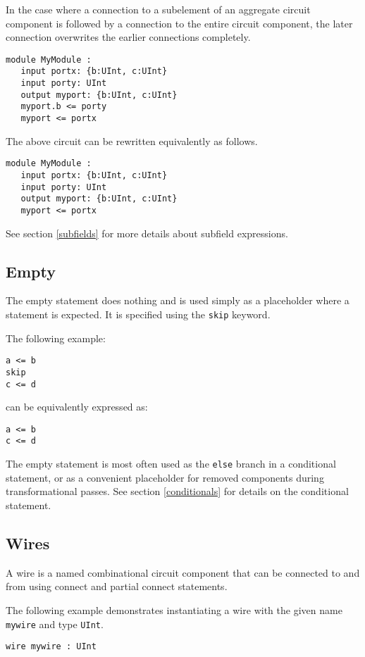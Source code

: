 \documentclass[12pt]{article}
\begin{document}
In the case where a connection to a subelement of an aggregate circuit component is followed by a connection to the entire circuit component, the later connection overwrites the earlier connections completely.

\begin{verbatim}
module MyModule :
   input portx: {b:UInt, c:UInt}
   input porty: UInt
   output myport: {b:UInt, c:UInt}
   myport.b <= porty
   myport <= portx
\end{verbatim}
The above circuit can be rewritten equivalently as follows.
\begin{verbatim}
module MyModule :
   input portx: {b:UInt, c:UInt}
   input porty: UInt
   output myport: {b:UInt, c:UInt}
   myport <= portx
\end{verbatim}

See section \ref{subfields} for more details about subfield expressions.

\subsection{Empty}
The empty statement does nothing and is used simply as a placeholder where a statement is expected. It is specified using the \verb|skip| keyword.

The following example:
\begin{verbatim}
a <= b
skip
c <= d
\end{verbatim}
can be equivalently expressed as:
\begin{verbatim}
a <= b
c <= d
\end{verbatim}

The empty statement is most often used as the \verb|else| branch in a conditional statement, or as a convenient placeholder for removed components during transformational passes. See section \ref{conditionals} for details on the conditional statement.

\subsection{Wires}
A wire is a named combinational circuit component that can be connected to and from using connect and partial connect statements.

The following example demonstrates instantiating a wire with the given name \verb|mywire| and type \verb|UInt|.

\begin{verbatim}
wire mywire : UInt
\end{verbatim}
\end{document}
